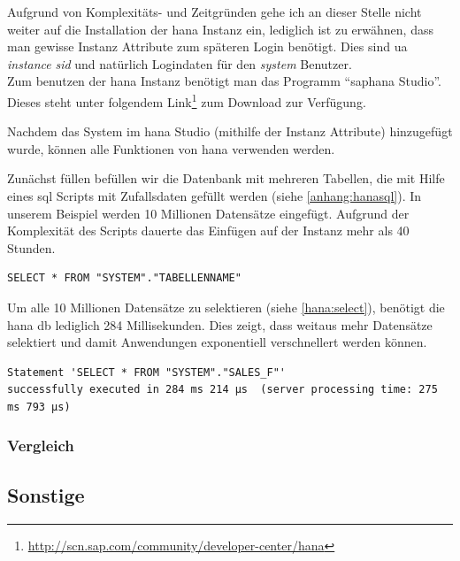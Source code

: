 Aufgrund von Komplexitäts- und Zeitgründen gehe ich an dieser Stelle nicht weiter auf die Installation der \gls{hana} Instanz ein, lediglich ist zu erwähnen, dass man gewisse Instanz Attribute zum späteren Login benötigt. Dies sind \gls{ua} \emph{instance} \emph{sid} und natürlich Logindaten für den \emph{system} Benutzer.\\
Zum benutzen der \gls{hana} Instanz benötigt man das Programm "`\gls{sap}\gls{hana} Studio"'. Dieses steht unter folgendem Link\footnote{\url{http://scn.sap.com/community/developer-center/hana}} zum Download zur Verfügung.

Nachdem das System im \gls{hana} Studio (mithilfe der Instanz Attribute) hinzugefügt wurde, können alle Funktionen von \gls{hana} verwenden werden.

Zunächst füllen befüllen wir die Datenbank mit mehreren Tabellen, die mit Hilfe eines \gls{sql} Scripts mit Zufallsdaten gefüllt werden (siehe \ref{anhang:hanasql}). In unserem Beispiel werden 10 Millionen Datensätze eingefügt. Aufgrund der Komplexität des Scripts dauerte das Einfügen auf der Instanz mehr als 40 Stunden.\\

\begin{lstlisting}
SELECT * FROM "SYSTEM"."TABELLENNAME"
\end{lstlisting}

Um alle 10 Millionen Datensätze zu selektieren  (siehe \ref{hana:select}), benötigt die \gls{hana} \gls{db} lediglich 284 Millisekunden. Dies zeigt, dass weitaus mehr Datensätze selektiert und damit Anwendungen exponentiell verschnellert werden können.

\begin{verbatim}
Statement 'SELECT * FROM "SYSTEM"."SALES_F"' 
successfully executed in 284 ms 214 µs  (server processing time: 275 ms 793 µs)
\end{verbatim}




\subsubsection{Vergleich}
\label{sec:db-hana-vgl}

\subsection{Sonstige}
\label{sec:db-sonstige}
